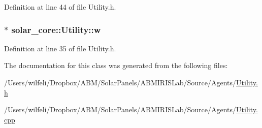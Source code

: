 Definition at line 44 of file Utility.\+h.

\hypertarget{classsolar__core_1_1_utility_af46cb137dd05f7b0cabe2aed249498fb}{}
\subsubsection[{w}]{$\ast$ solar\+\_\+core\+::\+Utility\+::w\hspace{0.3cm}{\ttfamily [protected]}}\label{classsolar__core_1_1_utility_af46cb137dd05f7b0cabe2aed249498fb}


Definition at line 35 of file Utility.\+h.



The documentation for this class was generated from the following files\+:\begin{DoxyCompactItemize}
\item 
/\+Users/wilfeli/\+Dropbox/\+A\+B\+M/\+Solar\+Panels/\+A\+B\+M\+I\+R\+I\+S\+Lab/\+Source/\+Agents/\hyperlink{_utility_8h}{Utility.\+h}\item 
/\+Users/wilfeli/\+Dropbox/\+A\+B\+M/\+Solar\+Panels/\+A\+B\+M\+I\+R\+I\+S\+Lab/\+Source/\+Agents/\hyperlink{_utility_8cpp}{Utility.\+cpp}\end{DoxyCompactItemize}
